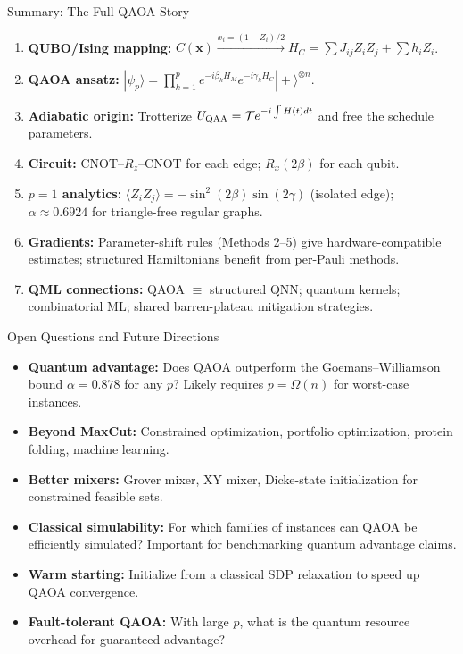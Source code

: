 \documentclass{beamer}
\begin{document}
\begin{frame}{Summary: The Full QAOA Story}
\begin{enumerate}
\item \textbf{QUBO/Ising mapping:}
  $C(\mathbf{x}) \xrightarrow{x_i=(1-Z_i)/2} H_C = \sum J_{ij}Z_iZ_j + \sum h_iZ_i$.

\item \textbf{QAOA ansatz:}
  $|\psi_p\rangle = \prod_{k=1}^p e^{-i\beta_k H_M}e^{-i\gamma_k H_C}|+\rangle^{\otimes n}$.

\item \textbf{Adiabatic origin:}
  Trotterize $U_{\rm QAA} = \mathcal{T}e^{-i\int H(t)dt}$ and free
  the schedule parameters.

\item \textbf{Circuit:}
  CNOT--$R_z$--CNOT for each edge; $R_x(2\beta)$ for each qubit.

\item \textbf{$p=1$ analytics:}
  $\langle Z_iZ_j\rangle = -\sin^2(2\beta)\sin(2\gamma)$ (isolated edge);
  $\alpha \approx 0.6924$ for triangle-free regular graphs.

\item \textbf{Gradients:}
  Parameter-shift rules (Methods 2--5) give hardware-compatible
  estimates; structured Hamiltonians benefit from per-Pauli methods.

\item \textbf{QML connections:}
  QAOA $\equiv$ structured QNN; quantum kernels; combinatorial ML;
  shared barren-plateau mitigation strategies.
\end{enumerate}
\end{frame}


\begin{frame}{Open Questions and Future Directions}
\begin{itemize}
\item \textbf{Quantum advantage:} Does QAOA outperform the
  Goemans--Williamson bound $\alpha=0.878$ for any $p$? Likely
  requires $p = \Omega(n)$ for worst-case instances.
\item \textbf{Beyond MaxCut:} Constrained optimization, portfolio
  optimization, protein folding, machine learning.
\item \textbf{Better mixers:} Grover mixer, XY mixer, Dicke-state
  initialization for constrained feasible sets.
\item \textbf{Classical simulability:} For which families of
  instances can QAOA be efficiently simulated? Important for
  benchmarking quantum advantage claims.
\item \textbf{Warm starting:} Initialize from a classical SDP
  relaxation to speed up QAOA convergence.
\item \textbf{Fault-tolerant QAOA:} With large $p$, what is the
  quantum resource overhead for guaranteed advantage?
\end{itemize}
\end{frame}
\end{document}
